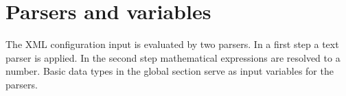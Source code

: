 \section{Parsers and variables}\label{general.parser}
The XML configuration input is evaluated by two parsers. In a first step a text parser is applied.
In the second step mathematical expressions are resolved to a number. Basic data types in the
global section serve as input variables for the parsers.


